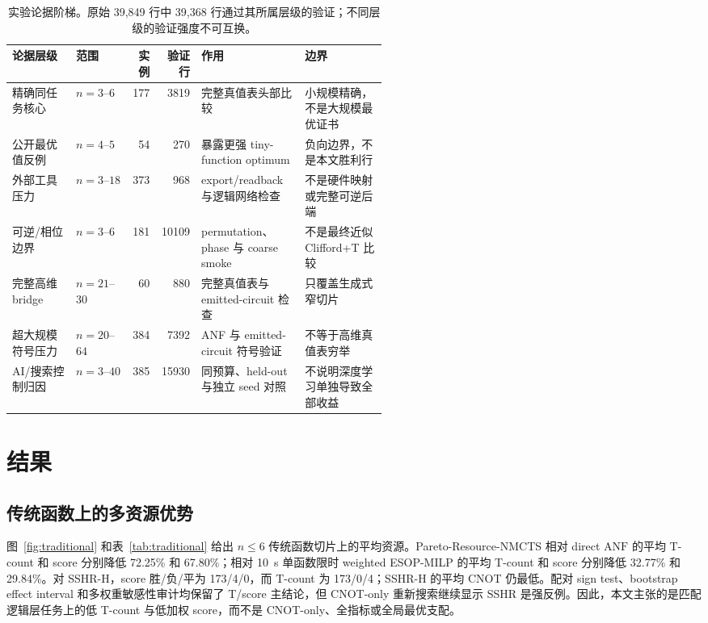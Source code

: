 \documentclass[UTF8,fontset=macnew,11pt]{ctexart}
\newcommand{\method}{Resource-NMCTS}
\newcommand{\anf}{\ensuremath{\mathrm{ANF}}}
\begin{document}
\begin{table}[H]
\centering
\tiny
\setlength{\tabcolsep}{2.1pt}
\renewcommand{\arraystretch}{1.04}
\caption{实验论据阶梯。原始 39,849 行中 39,368 行通过其所属层级的验证；不同层级的验证强度不可互换。}
\label{tab:evidence-ladder-zh}
\begin{tabularx}{\linewidth}{>{\raggedright\arraybackslash}p{0.17\linewidth}>{\raggedright\arraybackslash}p{0.15\linewidth}rr>{\raggedright\arraybackslash}X>{\raggedright\arraybackslash}p{0.22\linewidth}}
\toprule
论据层级 & 范围 & 实例 & 验证行 & 作用 & 边界 \\
\midrule
精确同任务核心 & $n=3$--$6$ & 177 & 3819 & 完整真值表头部比较 & 小规模精确，不是大规模最优证书 \\
公开最优值反例 & $n=4$--$5$ & 54 & 270 & 暴露更强 tiny-function optimum & 负向边界，不是本文胜利行 \\
外部工具压力 & $n=3$--$18$ & 373 & 968 & export/readback 与逻辑网络检查 & 不是硬件映射或完整可逆后端 \\
可逆/相位边界 & $n=3$--$6$ & 181 & 10109 & permutation、phase 与 coarse smoke & 不是最终近似 Clifford+T 比较 \\
完整高维 bridge & $n=21$--$30$ & 60 & 880 & 完整真值表与 emitted-circuit 检查 & 只覆盖生成式窄切片 \\
超大规模符号压力 & $n=20$--$64$ & 384 & 7392 & ANF 与 emitted-circuit 符号验证 & 不等于高维真值表穷举 \\
AI/搜索控制归因 & $n=3$--$40$ & 385 & 15930 & 同预算、held-out 与独立 seed 对照 & 不说明深度学习单独导致全部收益 \\
\bottomrule
\end{tabularx}
\end{table}

\section{结果}

\subsection{传统函数上的多资源优势}

图~\ref{fig:traditional} 和表~\ref{tab:traditional} 给出 $n\leq6$ 传统函数切片上的平均资源。Pareto-\method{} 相对 direct \anf{} 的平均 T-count 和 score 分别降低 72.25\% 和 67.80\%；相对 10~s 单函数限时 weighted ESOP-MILP 的平均 T-count 和 score 分别降低 32.77\% 和 29.84\%。对 SSHR-H，score 胜/负/平为 173/4/0，而 T-count 为 173/0/4；SSHR-H 的平均 CNOT 仍最低。配对 sign test、bootstrap effect interval 和多权重敏感性审计均保留了 T/score 主结论，但 CNOT-only 重新搜索继续显示 SSHR 是强反例。因此，本文主张的是匹配逻辑层任务上的低 T-count 与低加权 score，而不是 CNOT-only、全指标或全局最优支配。
\end{document}
